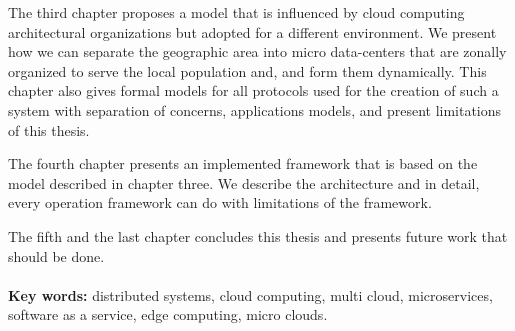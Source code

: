 The third chapter proposes a model that is influenced by cloud computing architectural organizations but adopted for a different environment. We present how we can separate the geographic area into micro data-centers that are zonally organized to serve the local population and, and form them dynamically. This chapter also gives formal models for all protocols used for the creation of such a system with separation of concerns, applications models, and present limitations of this thesis.

The fourth chapter presents an implemented framework that is based on the model described in chapter three. We describe the architecture and in detail, every operation framework can do with limitations of the framework.

The fifth and the last chapter concludes this thesis and presents future work that should be done.\\\\ 

\noindent
\textbf{Key words:} distributed systems, cloud computing, multi cloud, microservices, software as a service, edge computing, micro clouds.